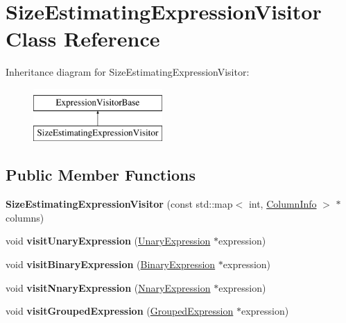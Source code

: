 \hypertarget{class_size_estimating_expression_visitor}{\section{Size\+Estimating\+Expression\+Visitor Class Reference}
\label{class_size_estimating_expression_visitor}
}
Inheritance diagram for Size\+Estimating\+Expression\+Visitor\+:\begin{figure}[H]
\begin{center}
\leavevmode
\includegraphics[height=2.000000cm]{class_size_estimating_expression_visitor}
\end{center}
\end{figure}
\subsection*{Public Member Functions}
\begin{DoxyCompactItemize}
\item 
\hypertarget{class_size_estimating_expression_visitor_a161843e94155226df99a16ab2227a024}{{\bfseries Size\+Estimating\+Expression\+Visitor} (const std\+::map$<$ int, \hyperlink{class_column_info}{Column\+Info} $>$ $\ast$columns)}\label{class_size_estimating_expression_visitor_a161843e94155226df99a16ab2227a024}

\item 
\hypertarget{class_size_estimating_expression_visitor_a6cbd26f2d5997577bd7f18d68f1cf866}{void {\bfseries visit\+Unary\+Expression} (\hyperlink{class_unary_expression}{Unary\+Expression} $\ast$expression)}\label{class_size_estimating_expression_visitor_a6cbd26f2d5997577bd7f18d68f1cf866}

\item 
\hypertarget{class_size_estimating_expression_visitor_a40a902ac926af0d18d976769abda5af3}{void {\bfseries visit\+Binary\+Expression} (\hyperlink{class_binary_expression}{Binary\+Expression} $\ast$expression)}\label{class_size_estimating_expression_visitor_a40a902ac926af0d18d976769abda5af3}

\item 
\hypertarget{class_size_estimating_expression_visitor_a1eeaaf34393c7c79fd4079bf8ea97bc9}{void {\bfseries visit\+Nnary\+Expression} (\hyperlink{class_nnary_expression}{Nnary\+Expression} $\ast$expression)}\label{class_size_estimating_expression_visitor_a1eeaaf34393c7c79fd4079bf8ea97bc9}

\item 
\hypertarget{class_size_estimating_expression_visitor_a8015f22031b44cbe54579f92b7e9cc00}{void {\bfseries visit\+Grouped\+Expression} (\hyperlink{class_grouped_expression}{Grouped\+Expression} $\ast$expression)}\label{class_size_estimating_expression_visitor_a8015f22031b44cbe54579f92b7e9cc00}

\end{DoxyCompactItemize}
